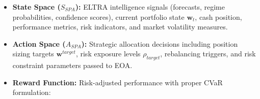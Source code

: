 \documentclass[11pt,a4paper]{article}
\begin{document}
\begin{itemize}
\item   \textbf{State Space ($S_{SPA}$):} ELTRA intelligence signals (forecasts, regime probabilities, confidence scores), current portfolio state $\mathbf{w}_t$, cash position, performance metrics, risk indicators, and market volatility measures.

\item   \textbf{Action Space ($A_{SPA}$):} Strategic allocation decisions including position sizing targets $\mathbf{w}^{target}$, risk exposure levels $\rho_{target}$, rebalancing triggers, and risk constraint parameters passed to EOA.

\item   \textbf{Reward Function:} Risk-adjusted performance with proper CVaR formulation:
\end{itemize}
\end{document}
